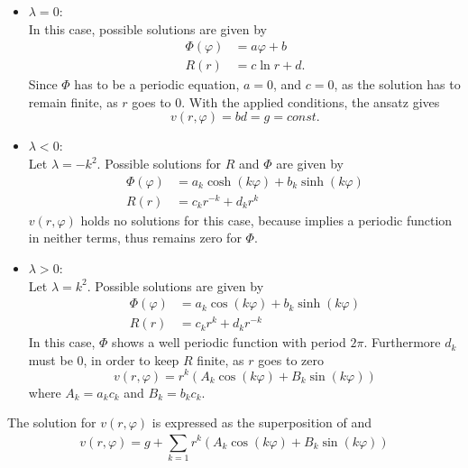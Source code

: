 \begin{itemize}
	\item {\boldmath$\lambda = 0$}: \\
		In this case, possible solutions are given by\\
		\begin{align}
			\Phi(\varphi)&= a \varphi + b\\
			R(r)         &= c \ln{r} + d
			\text{.}
		\end{align}
		Since $\Phi$ has to be a periodic equation, $a = 0$, and $c = 0$, as the solution has to remain finite, as $r$ goes to 0.
		With the applied conditions, the ansatz gives
		\begin{equation}
			\label{eq:vLambda1}
			v(r, \varphi) = b d = g = const.
		\end{equation}
%
	\item {\boldmath$\lambda < 0$}: \\
		Let $\lambda = -k^2$.
		Possible solutions for $R$ and $\Phi$ are given by
		\begin{align}
		\label{eq:phiLambda2}
			\Phi(\varphi)&= a_k \cosh{(k\varphi)} + b_k \sinh{(k\varphi)}\\
			R(r)         &= c_k r^{-k} + d_k r^{k}
		\end{align}
		$v(r,\varphi)$ holds no solutions for this case, because  implies a periodic function in neither terms, thus remains zero for $\Phi$.
%
	\item {\boldmath$\lambda > 0$}: \\
		Let $\lambda = k^2$.
		Possible solutions are given by
		\begin{align}
		\label{eq:phiLambda3}
			\Phi(\varphi)&= a_k \cos{(k\varphi)} + b_k \sinh{(k\varphi)}\\
			R(r)         &= c_k r^{k} + d_k r^{-k}
		\end{align}
		In this case, $\Phi$ shows a well periodic function with period $2\pi$.
		Furthermore $d_k$ must be 0, in order to keep $R$ finite, as $r$ goes to zero
		\begin{equation}
		\label{eq:vLambda3}
			v(r, \varphi) = r^k \left( A_k \cos{(k \varphi)} + B_k \sin(k \varphi)\right)
		\end{equation}
		where $A_k = a_k c_k$ and $B_k = b_k c_k$.
\end{itemize}
The solution for $v(r, \varphi)$ is expressed as the superposition of  and 
\begin{equation}
	v(r, \varphi) = g + \sum_{k=1}^{} r^k \left( A_k \cos{(k \varphi)} + B_k \sin(k \varphi)\right)
\end{equation}
